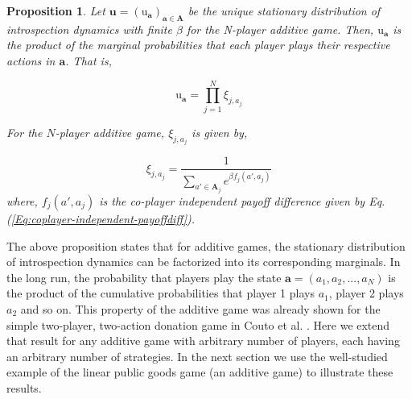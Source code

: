 \documentclass[11pt]{article}
\theoremstyle{plainCl1}
\newtheorem{Prop}{Proposition}
\theoremstyle{plainCl2}
\newcommand{\A}{\mathbf{A}}
\newcommand{\abf}{\mathbf{a}}
\newcommand{\ubf}{\mathbf{u}}
\begin{document}
\begin{Prop}
Let $\ubf = (\mathrm{u}_\abf)_{\abf \in \A}$ be the unique stationary distribution of introspection dynamics with finite $\beta$ for the N-player additive game. Then, $\mathrm{u}_\abf$ is the product of the marginal probabilities that each player plays their respective actions in $\abf$. That is, 

\begin{equation}
\mathrm{u}_\abf = \prod_{j = 1}^N \xi_{j,a_j}
\label{Eq:additive-game-products}
\end{equation}

\noindent For the $N$-player additive game, $\xi_{j,a_j}$ is given by,

\begin{equation}
\xi_{j,a_j} = \frac{1}{\displaystyle \sum_{a' \in \A_j} e^{\beta f_j(a',a_j)}} 
\label{Eq:marginal-at-additive-game}
\end{equation}
\noindent where, $f_j(a', a_j)$ is the co-player independent payoff difference given by Eq. (\ref{Eq:coplayer-independent-payoffdiff}).
\label{Th:additive-game-product-of-marginals}
\end{Prop}
\noindent The above proposition states that for additive games, the stationary distribution of introspection dynamics can be factorized into its corresponding marginals. In the long run, the probability that players play the state $\abf = (a_1, a_2, ...,a_N)$ is the product of the cumulative probabilities that player 1 plays $a_1$, player 2 plays $a_2$ and so on. This property of the additive game was already shown for the simple two-player, two-action donation game in Couto et al. \cite{Couto:NJP:2022}.  Here we extend that result for any additive game with arbitrary number of players, each having an arbitrary number of strategies. In the next section we use the well-studied example of the linear public goods game (an additive game) to illustrate these results.
\end{document}
